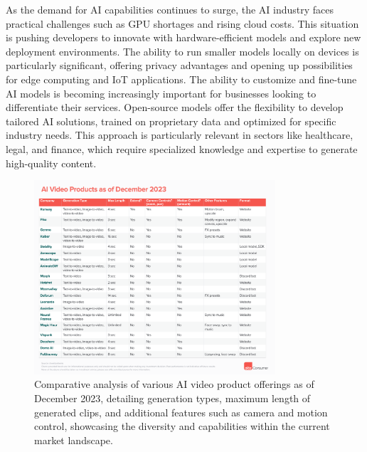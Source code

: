 \documentclass[11pt,a4paper,oneside]{report}
\begin{document}
As the demand for AI capabilities continues to surge, the AI industry faces practical challenges such as GPU shortages and rising cloud costs. 
This situation is pushing developers to innovate with hardware-efficient models and explore new deployment environments.
The ability to run smaller models locally on devices is particularly significant, offering privacy advantages and opening up possibilities for edge computing and IoT applications. 
The ability to customize and fine-tune AI models is becoming increasingly important for businesses looking to differentiate their services. 
Open-source models offer the flexibility to develop tailored AI solutions, trained on proprietary data and optimized for specific industry needs. 
This approach is particularly relevant in sectors like healthcare, legal, and finance, which require specialized knowledge and expertise to generate high-quality content.

\begin{figure}[htbp]
  \centering
  \includegraphics[width=0.8\textwidth]{products.png}
  \caption{Comparative analysis of various AI video product offerings as of December 2023, detailing generation types, maximum length of generated clips, and additional features such as camera and motion control, showcasing the diversity and capabilities within the current market landscape.\cite{a16zAI2023}}
\end{figure}
\end{document}
